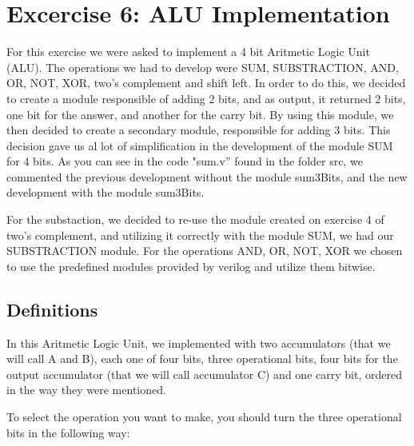 

\section{\color{olive}Excercise 6: ALU Implementation}

For this exercise we were asked to implement a 4 bit Aritmetic Logic
Unit (ALU). The operations we had to develop were SUM, SUBSTRACTION,
AND, OR, NOT, XOR, two's complement and shift left. In order to do this, we decided
to create a module responsible of adding 2 bits, and as output, it
returned 2 bits, one bit for the answer, and another for the carry
bit. By using this module, we then decided to create a secondary module,
responsible for adding 3 bits. This decision gave us al lot of simplification
in the development of the module SUM for 4 bits. As you can see in
the code "sum.v'' found in the folder src, we commented the previous
development without the module sum3Bits, and the new development with
the module sum3Bits.

For the substaction, we decided to re-use the module created on exercise
4 of two's complement, and utilizing it correctly with the module
SUM, we had our SUBSTRACTION module. For the operations AND, OR, NOT,
XOR we chosen to use the predefined modules provided by verilog and
utilize them bitwise.

\subsection{\color{purple}Definitions}

In this Aritmetic Logic Unit, we implemented with two accumulators
(that we will call A and B), each one of four bits, three operational
bits, four bits for the output accumulator (that we will call accumulator
C) and one carry bit, ordered in the way they were mentioned.

To select the operation you want to make, you should turn the three
operational bits in the following way:

